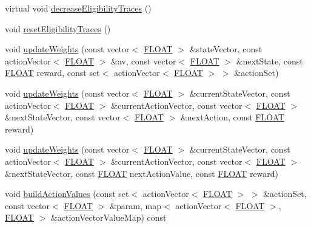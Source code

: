 \begin{DoxyCompactItemize}
\item 
virtual void \hyperlink{classAI_1_1Algorithm_1_1GradientDescent_a5c5ae472417bc016fdd185875614359d}{decrease\+Eligibility\+Traces} ()
\item 
void \hyperlink{classAI_1_1Algorithm_1_1GradientDescent_a2ce6e2bbfc5b4d821d02f454c0e3c8c5}{reset\+Eligibility\+Traces} ()
\item 
void \hyperlink{classAI_1_1Algorithm_1_1GradientDescent_a80faa3771790c726f20f2edff4ad8ff5}{update\+Weights} (const vector$<$ \hyperlink{namespaceAI_a41b74884a20833db653dded3918e05c3}{F\+L\+O\+A\+T} $>$ \&state\+Vector, const action\+Vector$<$ \hyperlink{namespaceAI_a41b74884a20833db653dded3918e05c3}{F\+L\+O\+A\+T} $>$ \&av, const vector$<$ \hyperlink{namespaceAI_a41b74884a20833db653dded3918e05c3}{F\+L\+O\+A\+T} $>$ \&next\+State, const \hyperlink{namespaceAI_a41b74884a20833db653dded3918e05c3}{F\+L\+O\+A\+T} reward, const set$<$ action\+Vector$<$ \hyperlink{namespaceAI_a41b74884a20833db653dded3918e05c3}{F\+L\+O\+A\+T} $>$ $>$ \&action\+Set)
\item 
void \hyperlink{classAI_1_1Algorithm_1_1GradientDescent_ab9193530a8d9c61f38707c5a3fc995eb}{update\+Weights} (const vector$<$ \hyperlink{namespaceAI_a41b74884a20833db653dded3918e05c3}{F\+L\+O\+A\+T} $>$ \&current\+State\+Vector, const action\+Vector$<$ \hyperlink{namespaceAI_a41b74884a20833db653dded3918e05c3}{F\+L\+O\+A\+T} $>$ \&current\+Action\+Vector, const vector$<$ \hyperlink{namespaceAI_a41b74884a20833db653dded3918e05c3}{F\+L\+O\+A\+T} $>$ \&next\+State\+Vector, const vector$<$ \hyperlink{namespaceAI_a41b74884a20833db653dded3918e05c3}{F\+L\+O\+A\+T} $>$ \&next\+Action, const \hyperlink{namespaceAI_a41b74884a20833db653dded3918e05c3}{F\+L\+O\+A\+T} reward)
\item 
void \hyperlink{classAI_1_1Algorithm_1_1GradientDescent_a353e283f916955efd47a830425583210}{update\+Weights} (const vector$<$ \hyperlink{namespaceAI_a41b74884a20833db653dded3918e05c3}{F\+L\+O\+A\+T} $>$ \&current\+State\+Vector, const action\+Vector$<$ \hyperlink{namespaceAI_a41b74884a20833db653dded3918e05c3}{F\+L\+O\+A\+T} $>$ \&current\+Action\+Vector, const vector$<$ \hyperlink{namespaceAI_a41b74884a20833db653dded3918e05c3}{F\+L\+O\+A\+T} $>$ \&next\+State\+Vector, const \hyperlink{namespaceAI_a41b74884a20833db653dded3918e05c3}{F\+L\+O\+A\+T} next\+Action\+Value, const \hyperlink{namespaceAI_a41b74884a20833db653dded3918e05c3}{F\+L\+O\+A\+T} reward)
\item 
void \hyperlink{classAI_1_1Algorithm_1_1GradientDescent_a7f58c9d3f1c760d5e4d1f9546abb1bec}{build\+Action\+Values} (const set$<$ action\+Vector$<$ \hyperlink{namespaceAI_a41b74884a20833db653dded3918e05c3}{F\+L\+O\+A\+T} $>$ $>$ \&action\+Set, const vector$<$ \hyperlink{namespaceAI_a41b74884a20833db653dded3918e05c3}{F\+L\+O\+A\+T} $>$ \&param, map$<$ action\+Vector$<$ \hyperlink{namespaceAI_a41b74884a20833db653dded3918e05c3}{F\+L\+O\+A\+T} $>$, \hyperlink{namespaceAI_a41b74884a20833db653dded3918e05c3}{F\+L\+O\+A\+T} $>$ \&action\+Vector\+Value\+Map) const 

\end{DoxyCompactItemize}

